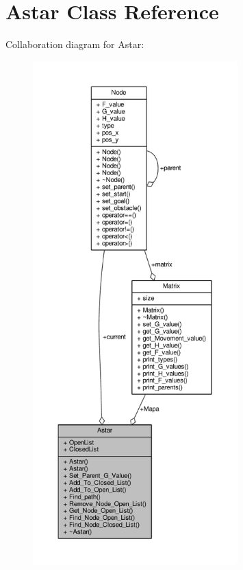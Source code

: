 \hypertarget{class_astar}{\section{Astar Class Reference}
\label{class_astar}
}


Collaboration diagram for Astar\+:
\nopagebreak
\begin{figure}[H]
\begin{center}
\leavevmode
\includegraphics[height=550pt]{class_astar__coll__graph}
\end{center}
\end{figure}
